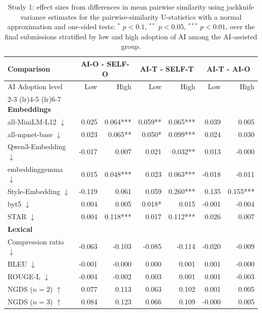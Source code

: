 \begin{table}[ht]
\centering
\small
\begin{tabular}{lrr|rr|rr}
\toprule
Comparison & \multicolumn{2}{c}{\textbf{AI-O - SELF-O}} & \multicolumn{2}{c}{\textbf{AI-T - SELF-T}} & \multicolumn{2}{c}{\textbf{AI-T - AI-O}} \\
\midrule
AI Adoption level & Low & High & Low & High & Low & High \\
\cmidrule(lr){2-3} \cmidrule(lr){4-5} \cmidrule(lr){6-7}
\midrule
\rowcolor{lightgray}
\textbf{Embeddings} & & & & & & \\
all-MiniLM-L12 $\downarrow$ & 0.025 & 0.064*** & 0.059** & 0.065*** & 0.039 & 0.005 \\
all-mpnet-base $\downarrow$ & 0.023 & 0.065** & 0.050* & 0.099*** & 0.024 & 0.030 \\
Qwen3-Embedding $\downarrow$ & -0.017 & 0.007 & 0.021 & 0.032** & 0.013 & -0.000 \\
embeddinggemma $\downarrow$ & 0.015 & 0.048*** & 0.023 & 0.063*** & -0.018 & -0.011 \\
Style-Embedding $\downarrow$ & -0.119 & 0.061 & 0.059 & 0.260*** & 0.135 & 0.155*** \\
byt5 $\downarrow$ & 0.004 & 0.005 & 0.018* & 0.015 & -0.001 & -0.004 \\
STAR $\downarrow$ & 0.004 & 0.118*** & 0.017 & 0.112*** & 0.026 & 0.007 \\
\midrule
\rowcolor{lightgray}
\textbf{Lexical} & & & & & & \\
Compression ratio $\downarrow$ & -0.063 & -0.103 & -0.085 & -0.114 & -0.020 & -0.009 \\
BLEU $\downarrow$ & -0.001 & -0.000 & 0.000 & 0.001 & 0.001 & -0.000 \\
ROUGE-L $\downarrow$ & -0.004 & -0.002 & 0.003 & 0.001 & 0.001 & -0.003 \\
NGDS ($n=2$) $\uparrow$ & 0.077 & 0.113 & 0.063 & 0.102 & 0.001 & 0.005 \\
NGDS ($n=3$) $\uparrow$ & 0.084 & 0.123 & 0.066 & 0.109 & -0.000 & 0.005 \\
\bottomrule
\end{tabular}
\caption{Study 1: effect sizes from differences in mean pairwise similarity using jackknife variance estimates for the pairwise-similarity U-statistics with a normal approximation and one-sided tests: $^{*}$ $p<0.1$, $^{**}$ $p<0.05$, $^{***}$ $p<0.01$, over the final submissions stratified by low and high adoption of AI among the AI-assisted group.}
\label{tab:effects_low_high_study1}
\end{table}

